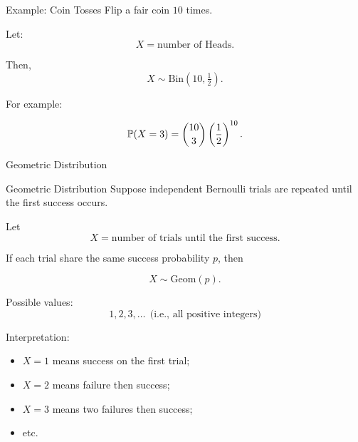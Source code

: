 \begin{frame}{Example: Coin Tosses}
Flip a fair coin $10$ times.

Let:
\[
X=\text{number of Heads}.
\]

Then,
\[
X\sim\text{Bin}(10,\tfrac12).
\]

\vspace{0.25cm}

For example:

\[
\mathbb{P}(X=3)
=
\binom{10}{3}
\left(\frac12\right)^{10}.
\]
\end{frame}


\begin{frame}{Geometric Distribution}
\begin{keybox}{Geometric Distribution}
Suppose independent Bernoulli trials are repeated until the first success occurs.

Let
\[
X=\text{number of trials until the first success}.
\]

If each trial share the same success probability $p$, then

\[
X\sim\text{Geom}(p).
\]
\end{keybox}

\vspace{0.25cm}

Possible values:
\[
1,2,3,\dots \ \ \text{(i.e., all positive integers)}
\]

\vspace{0.25cm}

Interpretation:
\begin{itemize}
    \item $X=1$ means success on the first trial;
    \item $X=2$ means failure then success;
    \item $X=3$ means two failures then success;
    \item etc.
\end{itemize}
\end{frame}

















